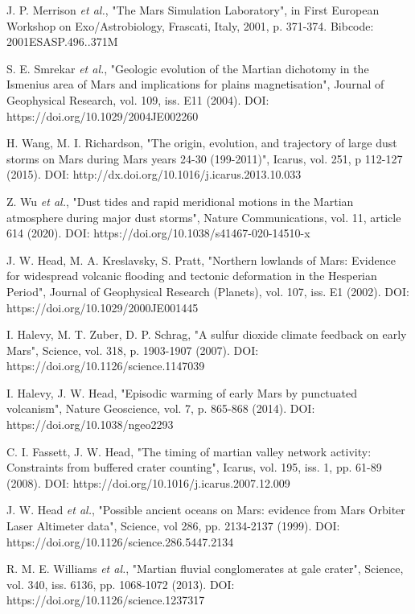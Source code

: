 \documentclass[12pt,onecolumn]{revtex4-2}    %
\begin{document}
\begin{thebibliography}{}
 J. P. Merrison \textit{et al.}, "The Mars Simulation Laboratory", in First European Workshop on Exo/Astrobiology, Frascati, Italy, 2001, p. 371-374. Bibcode: 2001ESASP.496..371M 

 S. E. Smrekar \textit{et al.}, "Geologic evolution of the Martian dichotomy in the Ismenius area of Mars and implications for plains magnetisation", Journal of Geophysical Research, vol. 109, iss. E11 (2004). DOI: https://doi.org/10.1029/2004JE002260

 H. Wang, M. I. Richardson, "The origin, evolution, and trajectory of large dust storms on Mars during Mars years 24-30 (199-2011)", Icarus, vol. 251, p 112-127 (2015). DOI: http://dx.doi.org/10.1016/j.icarus.2013.10.033

 Z. Wu \textit{et al.}, "Dust tides and rapid meridional motions in the Martian atmosphere during major dust storms", Nature Communications, vol. 11, article 614 (2020). DOI: https://doi.org/10.1038/s41467-020-14510-x

 J. W. Head, M. A. Kreslavsky, S. Pratt, "Northern lowlands of Mars: Evidence for widespread volcanic flooding and tectonic deformation in the Hesperian Period", Journal of Geophysical Research (Planets), vol. 107, iss. E1 (2002). DOI: https://doi.org/10.1029/2000JE001445

I. Halevy, M. T. Zuber, D. P. Schrag, "A sulfur dioxide climate feedback on early Mars", Science, vol. 318, p. 1903-1907 (2007). DOI: https://doi.org/10.1126/science.1147039

 I. Halevy, J. W. Head, "Episodic warming of early Mars by punctuated volcanism", Nature Geoscience, vol. 7, p. 865-868 (2014). DOI: 
https://doi.org/10.1038/ngeo2293

 C. I. Fassett, J. W. Head, "The timing of martian valley network activity: Constraints from buffered crater counting", Icarus, vol. 195, iss. 1, pp. 61-89 (2008). DOI:  https://doi.org/10.1016/j.icarus.2007.12.009

 J. W. Head \textit{et al.}, "Possible ancient oceans on Mars: evidence from Mars Orbiter Laser Altimeter data", Science, vol 286, pp. 2134-2137 (1999). DOI: https://doi.org/10.1126/science.286.5447.2134

 R. M. E. Williams \textit{et al.}, "Martian fluvial conglomerates at gale crater", Science, vol. 340, iss. 6136, pp. 1068-1072 (2013). DOI: https://doi.org/10.1126/science.1237317


\end{thebibliography}
\end{document}
